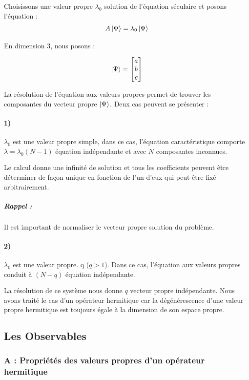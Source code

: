 \documentclass[12pt,a4paper,titlepage]{book}
\begin{document}
Choisissons une valeur propre $\lambda_0$ solution de l'équation séculaire et posons l'équation :
\begin{equation*}
A \ket{\Psi} = \lambda_0 \ket{\Psi}
\end{equation*}

En dimension 3, nous posons :
\begin{center}
\[
\ket{\Psi} =
\left[
\begin{matrix}
a\\
b\\
c
\end{matrix}
\right]
\]
\end{center}

La résolution de l'équation aux valeurs propres permet de trouver les composantes du vecteur propre $\ket{\Psi}$. Deux cas peuvent se présenter :
\paragraph*{1)}
$\lambda_0$ est une valeur propre simple, dans ce cas, l'équation caractéristique comporte $\lambda = \lambda_0 (N-1)$ équation indépendante et avec $N$ composantes inconnues.

Le calcul donne une infinité de solution et tous les coefficients peuvent être déterminer de façon unique en fonction de l'un d'eux qui peut-être fixé arbitrairement.
\subparagraph*{Rappel :}
Il est important de normaliser le vecteur propre solution du problème.

\paragraph*{2)}
$\lambda_0$ est une valeur propre. q ($q > 1$). Dans ce cas, l'équation aux valeurs propres conduit à $(N-q)$ équation indépendante.

La résolution de ce système nous donne $q$ vecteur propre indépendante. Nous avons traité le cas d'un opérateur hermitique car la dégénérescence d'une valeur propre hermitique est toujours égale à la dimension de son espace propre.

\subsection{Les Observables}
\subsubsection{A : Propriétés des valeurs propres d'un opérateur hermitique}
\end{document}
